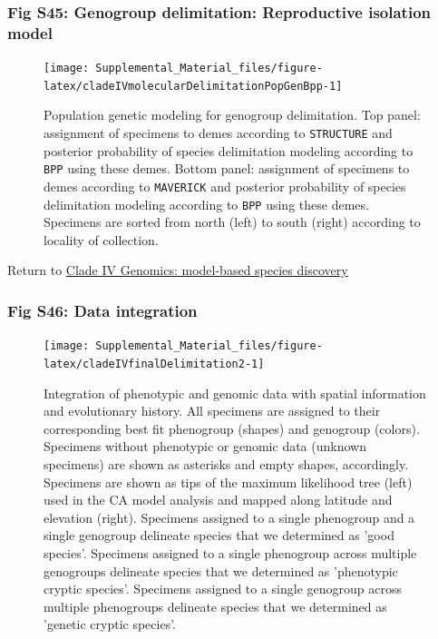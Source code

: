 \documentclass[
  11pt,
]{article}
\begin{document}
\hypertarget{fig-s45-genogroup-delimitation-reproductive-isolation-model}{%
\subsubsection{Fig S45: Genogroup delimitation: Reproductive isolation model}\label{fig-s45-genogroup-delimitation-reproductive-isolation-model}}

\begin{figure}
\texttt{[image: Supplemental\_Material\_files/figure-latex/cladeIVmolecularDelimitationPopGenBpp-1]} \caption{Population genetic modeling for genogroup delimitation. Top panel: assignment of specimens to demes according to \texttt{STRUCTURE} and posterior probability of species delimitation modeling according to \texttt{BPP} using these demes. Bottom panel: assignment of specimens to demes according to \texttt{MAVERICK} and posterior probability of species delimitation modeling according to \texttt{BPP} using these demes. Specimens are sorted from north (left) to south (right) according to locality of collection.}\label{fig:cladeIVmolecularDelimitationPopGenBpp}
\end{figure}

Return to \protect\hyperlink{model-based-species-discovery-7}{Clade IV Genomics: model-based species discovery}
\pagebreak

\hypertarget{fig-s46-data-integration}{%
\subsubsection{Fig S46: Data integration}\label{fig-s46-data-integration}}

\begin{figure}
\texttt{[image: Supplemental\_Material\_files/figure-latex/cladeIVfinalDelimitation2-1]} \caption{Integration of phenotypic and genomic data with spatial information and evolutionary history. All specimens are assigned to their corresponding best fit phenogroup (shapes) and genogroup (colors). Specimens without phenotypic or genomic data (unknown specimens) are shown as asterisks and empty shapes, accordingly. Specimens are shown as tips of the maximum likelihood tree (left) used in the CA model analysis and mapped along latitude and elevation (right). Specimens assigned to a single phenogroup and a single genogroup delineate species that we determined as 'good species'. Specimens assigned to a single phenogroup across multiple genogroups delineate species that we determined as 'phenotypic cryptic species'. Specimens assigned to a single genogroup across multiple phenogroups delineate species that we determined as 'genetic cryptic species'.}\label{fig:cladeIVfinalDelimitation2}
\end{figure}
\end{document}
